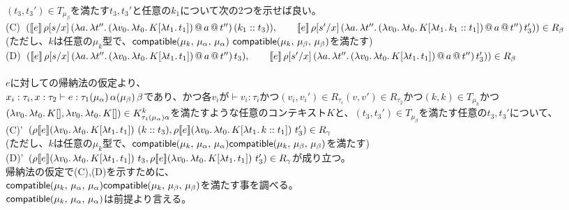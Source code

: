 $(t_3,t_3')\in T_{\mu_{\beta}}$を満たす$t_3, t_3'$と任意の$k_1$について次の2つを示せば良い。\\
(C)\ $(\CPS{e}{\rho[\Change{x}{s}]}
           {\LamP{a}{\Lam{t''}
               {\App{\App{\LamP{v_0}{\Lam{t_0}{K[\Lam{t_1}{t_1}]}}}{a}}{t''}}}}{\ConsP{k_1}{t_3}}),\\
  \qquad \CPS{e}{\rho[\Change{x}{s'}]}
           {\LamP{a}{\Lam{t''}
               {\App{\App{\LamP{v_0}{\Lam{t_0}{K[\Lam{t_1}{\Cons{k_1}{t_1}}]}}}{a}}{t''}}}}{t_3'}))\in R_{\beta}$\\
 (ただし、$k$は任意の$\mu_k$型で、$\Compatible{\mu_k}{\mu_{\alpha}}{\mu_{\alpha}}\ \Compatible{\mu_k}{\mu_{\beta}}{\mu_{\beta}}$を満たす)
\\
(D)\ $(\CPS{e}{\rho[\Change{x}{s}]}
           {\LamP{a}{\Lam{t''}
               {\App{\App{\LamP{v_0}{\Lam{t_0}{K[\Lam{t_1}{t_1}]}}}{a}}{t''}}}}{t_3}),\\
  \qquad \CPS{e}{\rho[\Change{x}{s'}]}
           {\LamP{a}{\Lam{t''}
               {\App{\App{\LamP{v_0}{\Lam{t_0}{K[\Lam{t_1}{t_1}]}}}{a}}{t''}}}}{t_3'}))\in R_{\beta}$\\
\\
$e$に対しての帰納法の仮定より、\\
$x_i:\tau_i, x:\tau_2 \vdash e:\tau_1 \TrailType{\alpha} \TrailType{\beta}$であり、かつ各$v_i$が$\vdash v_i:\tau_i$かつ$(v_i,v_i') \in R_{\tau_i} (v, v')\in R_{\tau_2}$かつ$(k,k)\in T_{\mu_k}$かつ$(\Lam{v_0}{\Lam{t_0}{K[]}}, \Lam{v_0}{\Lam{t_0}{K[]}})\in  K^k_{\tau_1(\mu_{\alpha})\alpha}$を満たすような任意のコンテキスト$K$と、$(t_3, t_3') \in T_{\mu_{\beta}}$を満たす任意の$t_3, t_3'$について、\\
(C)'\ $(\rho \CPSTh{e} \LamP{v_0}{\Lam{t_0}{K[\Lam{t_1}{t_1}]}}\ \ConsP{k}{t_3}, \rho \CPSTh{e} \LamP{v_0}{\Lam{t_0}{K[\Lam{t_1}{\Cons{k}{t_1}}]}}\ t_3')\in R_{\gamma}$\\
(ただし、$k$は任意の$\mu_k$型で、$\Compatible{\mu_k}{\mu_{\alpha}}{\mu_{\alpha}} \Compatible{\mu_k}{\mu_{\beta}}{\mu_{\beta}}$を満たす)\\
(D)'\ $(\rho \CPSTh{e} \LamP{v_0}{\Lam{t_0}{K[\Lam{t_1}{t_1}]}}\ t_3, \rho \CPSTh{e} \LamP{v_0}{\Lam{t_0}{K[\Lam{t_1}{t_1}]}}\ t_3')\in R_{\gamma}$が成り立つ。\\
帰納法の仮定で(C),(D)を示すために、\\
$\Compatible{\mu_k}{\mu_{\alpha}}{\mu_{\alpha}} \Compatible{\mu_k}{\mu_{\beta}}{\mu_{\beta}}$を満たす事を調べる。\\
$\Compatible{\mu_k}{\mu_{\alpha}}{\mu_{\alpha}}$は前提より言える。\\
